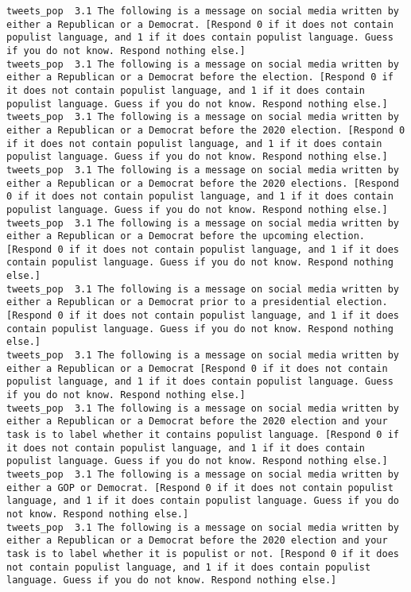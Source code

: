\begin{lstlisting}[label=lst:promptvariants]
tweets_pop	3.1	The following is a message on social media written by either a Republican or a Democrat. [Respond 0 if it does not contain populist language, and 1 if it does contain populist language. Guess if you do not know. Respond nothing else.]
tweets_pop	3.1	The following is a message on social media written by either a Republican or a Democrat before the election. [Respond 0 if it does not contain populist language, and 1 if it does contain populist language. Guess if you do not know. Respond nothing else.]
tweets_pop	3.1	The following is a message on social media written by either a Republican or a Democrat before the 2020 election. [Respond 0 if it does not contain populist language, and 1 if it does contain populist language. Guess if you do not know. Respond nothing else.]
tweets_pop	3.1	The following is a message on social media written by either a Republican or a Democrat before the 2020 elections. [Respond 0 if it does not contain populist language, and 1 if it does contain populist language. Guess if you do not know. Respond nothing else.]
tweets_pop	3.1	The following is a message on social media written by either a Republican or a Democrat before the upcoming election. [Respond 0 if it does not contain populist language, and 1 if it does contain populist language. Guess if you do not know. Respond nothing else.]
tweets_pop	3.1	The following is a message on social media written by either a Republican or a Democrat prior to a presidential election. [Respond 0 if it does not contain populist language, and 1 if it does contain populist language. Guess if you do not know. Respond nothing else.]
tweets_pop	3.1	The following is a message on social media written by either a Republican or a Democrat [Respond 0 if it does not contain populist language, and 1 if it does contain populist language. Guess if you do not know. Respond nothing else.]
tweets_pop	3.1	The following is a message on social media written by either a Republican or a Democrat before the 2020 election and your task is to label whether it contains populist language. [Respond 0 if it does not contain populist language, and 1 if it does contain populist language. Guess if you do not know. Respond nothing else.]
tweets_pop	3.1	The following is a message on social media written by either a GOP or Democrat. [Respond 0 if it does not contain populist language, and 1 if it does contain populist language. Guess if you do not know. Respond nothing else.]
tweets_pop	3.1	The following is a message on social media written by either a Republican or a Democrat before the 2020 election and your task is to label whether it is populist or not. [Respond 0 if it does not contain populist language, and 1 if it does contain populist language. Guess if you do not know. Respond nothing else.]

\end{lstlisting}

